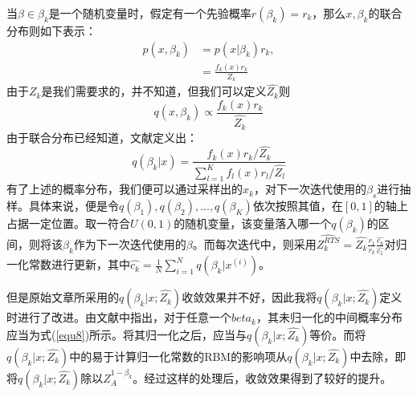 \documentclass[journal,a4paper]{IEEEtran}
\begin{document}
	当$\beta \in \beta_k$是一个随机变量时，假定有一个先验概率$r(\beta_k)=r_k$，那么$x,\beta_k$的联合分布则如下表示：
	\begin{align}
	p(x,\beta_k) & = p(x|\beta_k)r_k, \\
	& = \frac{f_k(x)r_k}{Z_k}
	\end{align}
	由于$Z_k$是我们需要求的，并不知道，但我们可以定义$\hat{Z_k}$则
	\begin{equation}
	q(x,\beta_k) \propto \frac{f_k(x)r_k}{\hat{Z_k}}
	\end{equation}
	由于联合分布已经知道，文献\cite{carlson2016partition}定义出：
	\begin{equation}
	q(\beta_k|x) = \frac{f_k(x)r_k/\hat{Z_k}}{\sum_{l=1}^{K} f_l(x)r_l/\hat{Z_l}}
	\end{equation}
	有了上述的概率分布，我们便可以通过采样出的$x_k$，对下一次迭代使用的$\beta_s$进行抽样。具体来说，便是令$q(\beta_1),q(\beta_2),...,q(\beta_K)$依次按照其值，在$[0,1]$的轴上占据一定位置。取一符合$U(0,1)$的随机变量，该变量落入哪一个$q(\beta_k)$的区间，则将该$\beta_k$作为下一次迭代使用的$\beta$。而每次迭代中，则采用$ \hat{Z_k^{RTS}} = \hat{Z_k}\frac{r_1}{r_k}\frac{\hat{c_k}}{\hat{c_1}}$对归一化常数进行更新，其中$\hat{c_k}=\frac{1}{N} \sum_{i=1}^N q(\beta_k|x^{(i)})$。

	但是原始文章所采用的$q(\beta_k|x;\hat{Z_k})$收敛效果并不好，因此我将$q(\beta_k|x;\hat{Z_k})$定义时进行了改进。由文献\cite{salakhutdinov2009learning}中指出，对于任意一个$beta_k$，其未归一化的中间概率分布应当为式(\ref{equ8})所示。将其归一化之后，应当与$q(\beta_k|x;\hat{Z_k})$等价。而将$q(\beta_k|x;\hat{Z_k})$中的易于计算归一化常数的RBM的影响项从$q(\beta_k|x;\hat{Z_k})$中去除，即将$q(\beta_k|x;\hat{Z_k})$除以$Z_A^{1-\beta_k}$。经过这样的处理后，收敛效果得到了较好的提升。
\end{document}
